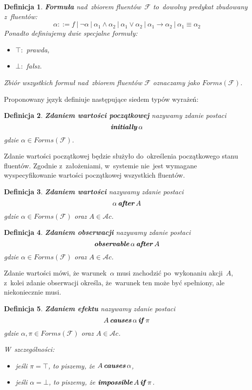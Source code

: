 \documentclass[11pt,a4paper]{article}
\newtheorem{defn}{Definicja}
\DeclareMathOperator{\Initially}{\textbf{\textit{initially}}}
\DeclareMathOperator{\After}{\textbf{\textit{after}}}
\DeclareMathOperator{\Observable}{\textbf{\textit{observable}}}
\DeclareMathOperator{\Causes}{\textbf{\textit{causes}}}
\DeclareMathOperator{\If}{\textbf{\textit{if}}}
\DeclareMathOperator{\Impossible}{\textbf{\textit{impossible}}}
\begin{document}
\begin{defn}
    \textbf{Formuła} nad~zbiorem fluentów~$\mathcal{F}$ to~dowolny predykat zbudowany z~fluentów: 
    $$ \alpha ::= f\ |\ \neg\alpha\ |\ \alpha_1 \land \alpha_2\ |\ \alpha_1 \lor \alpha_2\ |\ \alpha_1 \rightarrow \alpha_2\ |\ \alpha_1 \equiv \alpha_2 $$
    Ponadto definiujemy dwie specjalne formuły:
    
    \begin{itemize}
    \item $\top\colon$ prawda,
    
    \item $\bot\colon$ fałsz.
    \end{itemize}
    
    Zbiór wszystkich formuł nad~zbiorem fluentów $\mathcal{F}$ oznaczamy jako $Forms(\mathcal{F})$.
\end{defn}

Proponowany język definiuje następujące siedem typów wyrażeń:

\begin{defn}
    \textbf{Zdaniem wartości początkowej} nazywamy zdanie postaci
    $$ \Initially \alpha $$
    gdzie $\alpha \in Forms(\mathcal{F})$.
\end{defn}

Zdanie wartości początkowej będzie służyło do~określenia początkowego stanu fluentów.
Zgodnie z~założeniami, w~systemie nie~jest wymagane wyspecyfikowanie wartości początkowej wszystkich fluentów.

\begin{defn}
    \textbf{Zdaniem wartości} nazywamy zdanie postaci
    $$ \alpha \After A $$
    gdzie $\alpha \in Forms(\mathcal{F})$ oraz $A \in \mathcal{A}c$.
\end{defn}

\begin{defn}
    \textbf{Zdaniem obserwacji} nazywamy zdanie postaci
    $$ \Observable \alpha \After A $$
    gdzie $\alpha \in Forms(\mathcal{F})$ oraz $A \in \mathcal{A}c$.
\end{defn}

Zdanie wartości mówi, że warunek~$\alpha$ musi zachodzić po~wykonaniu akcji~$A$, z~kolei zdanie obserwacji określa, że~warunek ten może być spełniony, ale niekoniecznie musi.

\begin{defn}
    \textbf{Zdaniem efektu} nazywamy zdanie postaci
    $$A \Causes \alpha \If \pi$$
    gdzie $\alpha, \pi \in Forms(\mathcal{F})$ oraz $A \in \mathcal{A}c$.

    W~szczególności:
    \begin{itemize}
        \item jeśli $\pi = \top$, to piszemy, że $A \Causes \alpha$,
        \item jeśli $\alpha = \bot$, to piszemy, że $\Impossible A \If \pi$.
    \end{itemize}
\end{defn}
\end{document}
